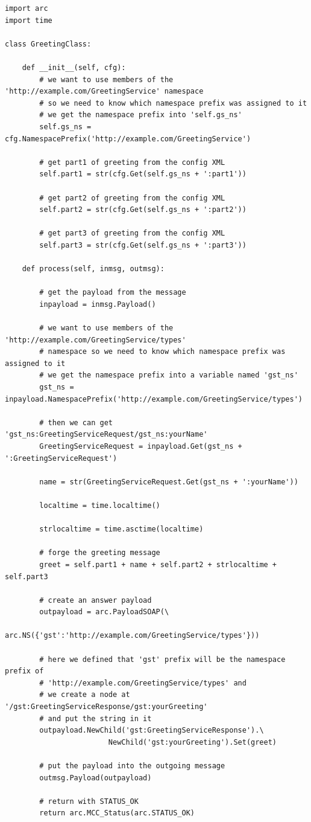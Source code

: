 \documentclass{article}
\begin{document}
\begin{verbatim}
import arc
import time

class GreetingClass:

    def __init__(self, cfg):
        # we want to use members of the 'http://example.com/GreetingService' namespace
        # so we need to know which namespace prefix was assigned to it
        # we get the namespace prefix into 'self.gs_ns'
        self.gs_ns = cfg.NamespacePrefix('http://example.com/GreetingService')

        # get part1 of greeting from the config XML
        self.part1 = str(cfg.Get(self.gs_ns + ':part1'))

        # get part2 of greeting from the config XML
        self.part2 = str(cfg.Get(self.gs_ns + ':part2'))

        # get part3 of greeting from the config XML
        self.part3 = str(cfg.Get(self.gs_ns + ':part3'))

    def process(self, inmsg, outmsg):

        # get the payload from the message
        inpayload = inmsg.Payload()

        # we want to use members of the 'http://example.com/GreetingService/types'
        # namespace so we need to know which namespace prefix was assigned to it
        # we get the namespace prefix into a variable named 'gst_ns'
        gst_ns = inpayload.NamespacePrefix('http://example.com/GreetingService/types')

        # then we can get 'gst_ns:GreetingServiceRequest/gst_ns:yourName'
        GreetingServiceRequest = inpayload.Get(gst_ns + ':GreetingServiceRequest')

        name = str(GreetingServiceRequest.Get(gst_ns + ':yourName'))

        localtime = time.localtime()

        strlocaltime = time.asctime(localtime)

        # forge the greeting message
        greet = self.part1 + name + self.part2 + strlocaltime + self.part3

        # create an answer payload
        outpayload = arc.PayloadSOAP(\
                        arc.NS({'gst':'http://example.com/GreetingService/types'}))

        # here we defined that 'gst' prefix will be the namespace prefix of
        # 'http://example.com/GreetingService/types' and
        # we create a node at '/gst:GreetingServiceResponse/gst:yourGreeting' 
        # and put the string in it
        outpayload.NewChild('gst:GreetingServiceResponse').\
                        NewChild('gst:yourGreeting').Set(greet)

        # put the payload into the outgoing message
        outmsg.Payload(outpayload)

        # return with STATUS_OK
        return arc.MCC_Status(arc.STATUS_OK)
\end{verbatim}
\end{document}
